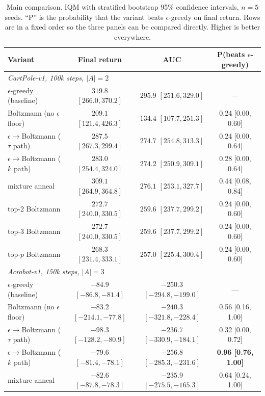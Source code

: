 \documentclass[11pt,a4paper]{article}
\newcommand{\eg}{$\epsilon$-greedy}
\begin{document}
\begin{table}[t]
\centering
\small
\caption{Main comparison. IQM with stratified bootstrap 95\% confidence
intervals, $n = 5$ seeds. ``P'' is the probability that the variant beats
$\epsilon$-greedy on final return. Rows are in a fixed order so the three
panels can be compared directly. Higher is better everywhere.}
\label{tab:main}
\begin{tabular}{lccc}
\toprule
Variant & Final return & AUC & P(beats \eg) \\
\midrule
\multicolumn{4}{l}{\textit{CartPole-v1, 100k steps, $|A| = 2$}}\\
\midrule
$\epsilon$-greedy (baseline) & $319.8$ $[266.0, 370.2]$ & $295.9$ $[251.6, 329.0]$ & --- \\
Boltzmann (no $\epsilon$ floor) & $209.1$ $[121.4, 426.3]$ & $134.4$ $[107.7, 251.3]$ & 0.24 [0.00, 0.60] \\
$\epsilon\to$Boltzmann ($\tau$ path) & $287.5$ $[267.3, 299.4]$ & $274.7$ $[254.8, 313.3]$ & 0.24 [0.00, 0.64] \\
$\epsilon\to$Boltzmann ($k$ path) & $283.0$ $[254.4, 324.0]$ & $274.2$ $[250.9, 309.1]$ & 0.28 [0.00, 0.64] \\
mixture anneal & $309.1$ $[264.9, 364.8]$ & $276.1$ $[253.1, 327.7]$ & 0.44 [0.08, 0.84] \\
top-2 Boltzmann & $272.7$ $[240.0, 330.5]$ & $259.6$ $[237.7, 299.2]$ & 0.24 [0.00, 0.60] \\
top-3 Boltzmann & $272.7$ $[240.0, 330.5]$ & $259.6$ $[237.7, 299.2]$ & 0.24 [0.00, 0.60] \\
top-$p$ Boltzmann & $268.3$ $[231.4, 333.1]$ & $257.0$ $[225.4, 300.4]$ & 0.24 [0.00, 0.60] \\
\midrule
\multicolumn{4}{l}{\textit{Acrobot-v1, 150k steps, $|A| = 3$}}\\
\midrule
$\epsilon$-greedy (baseline) & $-84.9$ $[-86.8, -81.4]$ & $-250.3$ $[-294.8, -199.0]$ & --- \\
Boltzmann (no $\epsilon$ floor) & $-83.2$ $[-214.1, -77.8]$ & $-240.3$ $[-321.8, -228.4]$ & 0.56 [0.16, 1.00] \\
$\epsilon\to$Boltzmann ($\tau$ path) & $-98.3$ $[-128.2, -80.9]$ & $-236.7$ $[-330.9, -184.1]$ & 0.32 [0.00, 0.72] \\
$\epsilon\to$Boltzmann ($k$ path) & $\mathbf{-79.6}$ $[-81.4, -78.1]$ & $-256.8$ $[-285.3, -231.6]$ & \textbf{0.96 [0.76, 1.00]} \\
mixture anneal & $-82.6$ $[-87.8, -78.3]$ & $-235.9$ $[-275.5, -165.3]$ & 0.64 [0.24, 1.00] \\

\end{tabular}
\end{table}
\end{document}
